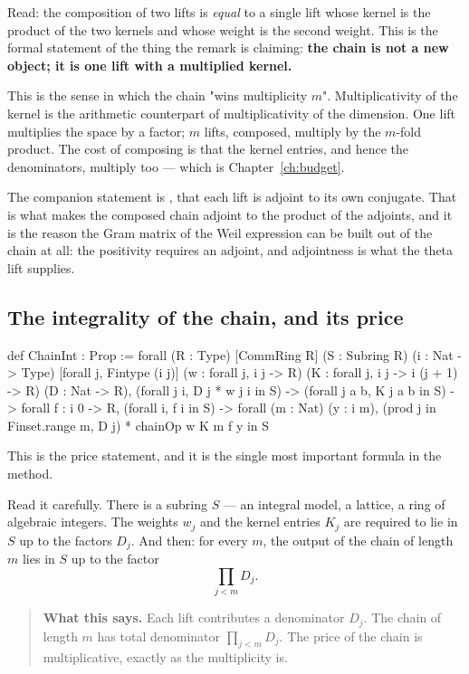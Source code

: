 Read: the composition of two lifts is \emph{equal} to a single lift whose
kernel is the product of the two kernels and whose weight is the second
weight. This is the formal statement of the thing the remark is claiming:
\textbf{the chain is not a new object; it is one lift with a multiplied
kernel.}

This is the sense in which the chain "wins multiplicity $m$". Multiplicativity
of the kernel is the arithmetic counterpart of multiplicativity of the
dimension. One lift multiplies the space by a factor; $m$ lifts, composed,
multiply by the $m$-fold product. The cost of composing is that the kernel
entries, and hence the denominators, multiply too --- which is
Chapter~\ref{ch:budget}.

The companion statement is , that each lift is adjoint to
its own conjugate. That is what makes the composed chain adjoint to the
product of the adjoints, and it is the reason the Gram matrix of the Weil
expression can be built out of the chain at all: the positivity requires an
adjoint, and adjointness is what the theta lift supplies.

\subsection{The integrality of the chain, and its price}\begin{seamnote}{}
{\footnotesize
\begin{leanquote}
def ChainInt : Prop :=
forall (R : Type) [CommRing R] (S : Subring R) (i : Nat ->
    Type) [forall j, Fintype (i j)]
(w : forall j, i j -> R) (K : forall j, i j -> i (j + 1) ->
      R) (D : Nat -> R),
(forall j i, D j * w j i in S) -> (forall j a b, K j a b in
      S) ->
forall f : i 0 -> R, (forall i, f i in S) -> forall (m :
      Nat) (y : i m),
(prod j in Finset.range m, D j) * chainOp w K m f y in S
\end{leanquote}
}
\end{seamnote}

This is the price statement, and it is the single most important formula in
the method.

Read it carefully. There is a subring $S$ --- an integral model, a lattice, a
ring of algebraic integers. The weights $w_j$ and the kernel entries $K_j$ are
required to lie in $S$ up to the factors $D_j$. And then: for every $m$, the
output of the chain of length $m$ lies in $S$ up to the factor
\[
\prod_{j < m} D_j.
\]

\begin{quote}
\textbf{What this says.} Each lift contributes a denominator $D_j$. The chain of
length $m$ has total denominator $\prod_{j<m} D_j$. The price of the chain is
multiplicative, exactly as the multiplicity is.
\end{quote}

